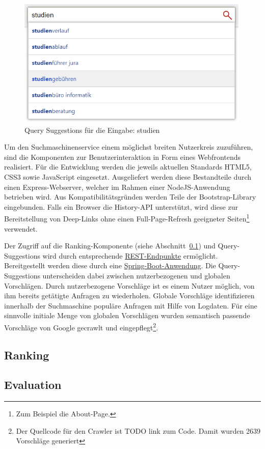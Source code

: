 \begin{figure}[!ht]
	\includegraphics[width=0.99\textwidth]{chapter_query_processing/autocomplete.png}
	\caption{Query Suggestions für die Eingabe: studien}
	\label{fig:query_suggestions}
\end{figure}

Um den Suchmaschinenservice einem möglichst breiten Nutzerkreis zuzuführen, sind die
Komponenten zur Benutzerinteraktion in Form eines Webfrontends realisiert. Für die Entwicklung
werden die jeweils aktuellen Standards HTML5, CSS3 sowie JavaScript eingesetzt. 
Ausgeliefert werden diese Bestandteile durch einen Express-Webserver, welcher im Rahmen einer NodeJS-Anwendung betrieben wird.
Aus Kompatibilitätsgründen werden Teile der Bootstrap-Library eingebunden.
Falls ein Browser die History-API unterstützt, wird diese zur
Bereitstellung von Deep-Links ohne einen Full-Page-Refresh
geeigneter Seiten\footnote{Zum Beispiel die About-Page.} verwendet.

Der Zugriff auf die Ranking-Komponente (siehe Abschnitt~\ref{chap:ranking}) und Query-Suggestions wird durch
entsprechende \href{https://en.wikipedia.org/wiki/Representational_state_transfer}{REST-Endpunkte} ermöglicht.
Bereitgestellt werden diese durch eine \href{https://projects.spring.io/spring-boot/}{Spring-Boot-Anwendung}.
Die Query-Suggestions unterscheiden dabei zwischen nutzerbezogenen und globalen Vorschlägen.
Durch nutzerbezogene Vorschläge ist es einem Nutzer möglich, von ihm bereits getätigte Anfragen zu wiederholen.
Globale Vorschläge identifizieren innerhalb der Suchmaschine populäre Anfragen mit Hilfe von Logdaten.
Für eine sinnvolle initiale Menge von globalen Vorschlägen wurden semantisch passende
Vorschläge von Google gecrawlt und eingepflegt\footnote{Der Quellcode für den Crawler ist TODO link zum Code.
Damit wurden 2639 Vorschläge generiert}.


\subsection{Ranking~\cite{croft.chap2}}
\label{chap:ranking}



\subsection{Evaluation~\cite{croft.chap2}}
\label{chap:evaluation}


